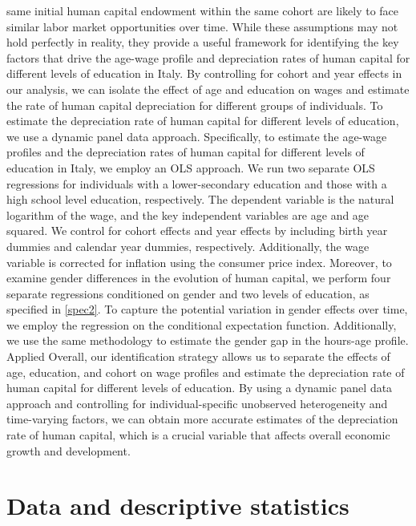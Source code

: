 \documentclass[14pt]{sistedes}
\begin{document}
same initial human capital endowment within the same cohort are likely to face similar labor market opportunities over
time.\newline
While these assumptions may not hold perfectly in reality, they provide a useful framework for identifying the key
factors that drive the age-wage profile and depreciation rates of human capital for different levels of education in
Italy. By controlling for cohort and year effects in our analysis, we can isolate the effect of age and education on
wages and estimate the rate of human capital depreciation for different groups of individuals.
\newline
To estimate the depreciation rate of human capital for different levels of education, we use a dynamic panel data
approach. Specifically, to estimate the age-wage profiles and the depreciation rates of human capital for different
levels of education in Italy, we employ an OLS approach. We run two separate OLS regressions for individuals with a
lower-secondary education and those with a high school level education, respectively. The dependent variable is the
natural logarithm of the wage, and the key independent variables are age and age squared. We control for cohort effects
and year effects by including birth year dummies and calendar year dummies, respectively. Additionally, the wage
variable is corrected for inflation using the consumer price index.
\newline
Moreover, to examine gender differences in the evolution of human capital, we perform four separate regressions
conditioned on gender and two levels of education, as specified in \ref{spec2}. To capture the potential variation in
gender effects over time, we employ the regression on the conditional expectation function. Additionally, we use the
same methodology to estimate the gender gap in the hours-age profile.
\newline
 Applied Overall, our identification strategy allows us to separate the effects of age, education, and cohort on wage
 profiles and estimate the depreciation rate of human capital for different levels of education. By using a dynamic
 panel data approach and controlling for individual-specific unobserved heterogeneity and time-varying factors, we can
 obtain more accurate estimates of the depreciation rate of human capital, which is a crucial variable that affects
 overall economic growth and development.
\section{Data and descriptive statistics}
\end{document}
